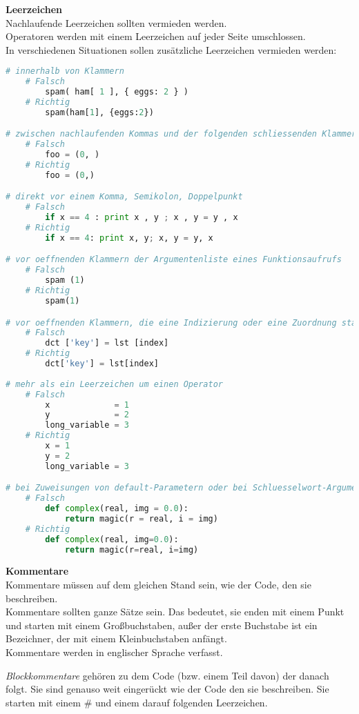 \textbf{Leerzeichen}\\
Nachlaufende Leerzeichen sollten vermieden werden.\\
Operatoren werden mit einem Leerzeichen auf jeder Seite umschlossen.\\
In verschiedenen Situationen sollen zusätzliche Leerzeichen vermieden werden:
\begin{lstlisting}[language = Python, caption = Situationen in denen zusätzliche Leerzeichen vermieden werden sollten, label = lst:leerzeichen]
# innerhalb von Klammern
	# Falsch
		spam( ham[ 1 ], { eggs: 2 } )
	# Richtig
		spam(ham[1], {eggs:2})

# zwischen nachlaufenden Kommas und der folgenden schliessenden Klammer
	# Falsch
		foo = (0, )
	# Richtig
		foo = (0,)

# direkt vor einem Komma, Semikolon, Doppelpunkt
	# Falsch
		if x == 4 : print x , y ; x , y = y , x
	# Richtig
		if x == 4: print x, y; x, y = y, x

# vor oeffnenden Klammern der Argumentenliste eines Funktionsaufrufs
	# Falsch
		spam (1)
	# Richtig
		spam(1)

# vor oeffnenden Klammern, die eine Indizierung oder eine Zuordnung starten
	# Falsch
		dct ['key'] = lst [index]
	# Richtig
		dct['key'] = lst[index]
		
# mehr als ein Leerzeichen um einen Operator
	# Falsch
		x			  = 1
		y			  = 2
		long_variable = 3
	# Richtig
		x = 1
		y = 2
		long_variable = 3

# bei Zuweisungen von default-Parametern oder bei Schluesselwort-Argumenten
	# Falsch
		def complex(real, img = 0.0):
			return magic(r = real, i = img)
	# Richtig
		def complex(real, img=0.0):
			return magic(r=real, i=img)
\end{lstlisting}

\textbf{Kommentare}\\
Kommentare müssen auf dem gleichen Stand sein, wie der Code, den sie beschreiben.\\
Kommentare sollten ganze Sätze sein. Das bedeutet, sie enden mit einem Punkt und starten mit einem Großbuchstaben, außer der erste Buchstabe ist ein Bezeichner, der mit einem Kleinbuchstaben anfängt. \\
Kommentare werden in englischer Sprache verfasst.

\textit{Blockkommentare} gehören zu dem Code (bzw. einem Teil davon) der danach folgt. Sie sind genauso weit eingerückt wie der Code den sie beschreiben. Sie starten mit einem \# und einem darauf folgenden Leerzeichen.

